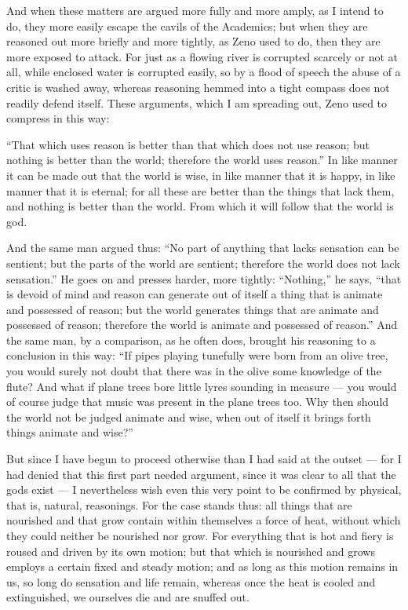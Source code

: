  And when these matters are argued more fully and more amply, as I intend to do, they more easily escape the cavils of the Academics; but when they are reasoned out more briefly and more tightly, as Zeno used to do, then they are more exposed to attack. For just as a flowing river is corrupted scarcely or not at all, while enclosed water is corrupted easily, so by a flood of speech the abuse of a critic is washed away, whereas reasoning hemmed into a tight compass does not readily defend itself. These arguments, which I am spreading out, Zeno used to compress in this way:

 ``That which uses reason is better than that which does not use reason; but nothing is better than the world; therefore the world uses reason.'' In like manner it can be made out that the world is wise, in like manner that it is happy, in like manner that it is eternal; for all these are better than the things that lack them, and nothing is better than the world. From which it will follow that the world is god.

 And the same man argued thus: ``No part of anything that lacks sensation can be sentient; but the parts of the world are sentient; therefore the world does not lack sensation.'' He goes on and presses harder, more tightly: ``Nothing,'' he says, ``that is devoid of mind and reason can generate out of itself a thing that is animate and possessed of reason; but the world generates things that are animate and possessed of reason; therefore the world is animate and possessed of reason.'' And the same man, by a comparison, as he often does, brought his reasoning to a conclusion in this way: ``If pipes playing tunefully were born from an olive tree, you would surely not doubt that there was in the olive some knowledge of the flute? And what if plane trees bore little lyres sounding in measure — you would of course judge that music was present in the plane trees too. Why then should the world not be judged animate and wise, when out of itself it brings forth things animate and wise?''

 But since I have begun to proceed otherwise than I had said at the outset — for I had denied that this first part needed argument, since it was clear to all that the gods exist — I nevertheless wish even this very point to be confirmed by physical, that is, natural, reasonings. For the case stands thus: all things that are nourished and that grow contain within themselves a force of heat, without which they could neither be nourished nor grow. For everything that is hot and fiery is roused and driven by its own motion; but that which is nourished and grows employs a certain fixed and steady motion; and as long as this motion remains in us, so long do sensation and life remain, whereas once the heat is cooled and extinguished, we ourselves die and are snuffed out.


